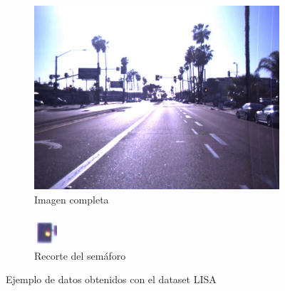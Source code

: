 \begin{figure}[h!]
    \begin{subfigure}[c]{.7\textwidth}
      \centering
      \includegraphics[width=.7\linewidth]{img/ejemploLisa.jpg}
      \caption{Imagen completa}
    \end{subfigure}%
    \begin{subfigure}[c]{.3\textwidth}
      \centering
      \includegraphics[width=.8\linewidth]{img/recortesemaf.jpg}
      \caption{ Recorte del semáforo }
    \end{subfigure}
    
    \caption{Ejemplo de datos obtenidos con el dataset LISA}
    \label{fig:ejemploLisa}
\end{figure}

